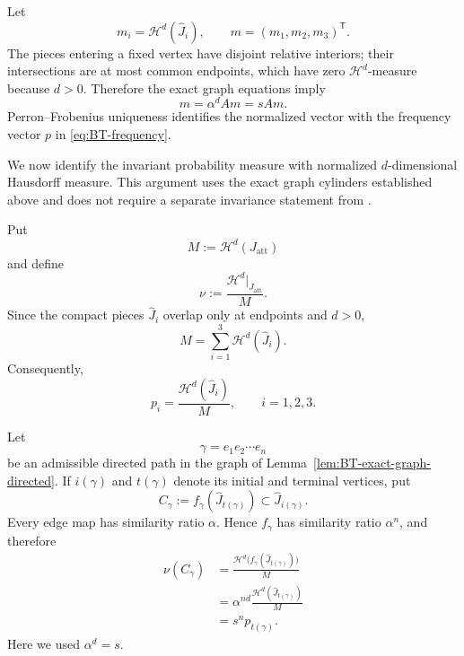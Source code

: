 \documentclass[11pt]{amsart}
\theoremstyle{plain}
\theoremstyle{definition}
\theoremstyle{remark}
\begin{document}
Let
\[
        m_i=\mathcal H^d(\widehat J_i),
        \qquad
        m=(m_1,m_2,m_3)^{\mathsf T}.
\]
The pieces entering a fixed vertex have disjoint relative interiors; their intersections are
at most common endpoints, which have zero \(\mathcal H^d\)-measure because \(d>0\).
Therefore the exact graph equations imply
\[
        m=\alpha^dAm=sAm.
\]
Perron--Frobenius uniqueness identifies the normalized vector with the frequency vector
\(p\) in \eqref{eq:BT-frequency}.

We now identify the invariant probability measure with normalized
\(d\)-dimensional Hausdorff measure. This argument uses the exact graph
cylinders established above and does not require a separate invariance
statement from \cite{BruinTroubetzkoy2003}.

Put
\[
        M:=\mathcal H^d(J_{\mathrm{att}})
\]
and define
\[
        \nu
        :=
        \frac{\mathcal H^d|_{J_{\mathrm{att}}}}{M}.
\]
Since the compact pieces \(\widehat J_i\) overlap only at endpoints and
\(d>0\),
\[
        M
        =
        \sum_{i=1}^{3}\mathcal H^d(\widehat J_i).
\]
Consequently,
\[
        p_i
        =
        \frac{\mathcal H^d(\widehat J_i)}{M},
        \qquad i=1,2,3.
\tag{B.3}
\label{eq:BT-Hausdorff-vertex-masses}
\]

Let
\[
        \gamma=e_1e_2\cdots e_n
\]
be an admissible directed path in the graph of
Lemma~\ref{lem:BT-exact-graph-directed}. If \(i(\gamma)\) and
\(t(\gamma)\) denote its initial and terminal vertices, put
\[
        C_\gamma
        :=
        f_\gamma(\widehat J_{t(\gamma)})
        \subset\widehat J_{i(\gamma)}.
\]
Every edge map has similarity ratio \(\alpha\). Hence
\(f_\gamma\) has similarity ratio \(\alpha^n\), and therefore
\[
\begin{aligned}
        \nu(C_\gamma)
        &=
        \frac{
        \mathcal H^d
        \bigl(f_\gamma(\widehat J_{t(\gamma)})\bigr)
        }{M}\\
        &=
        \alpha^{nd}
        \frac{\mathcal H^d(\widehat J_{t(\gamma)})}{M}\\
        &=
        s^n p_{t(\gamma)}.
\end{aligned}
\tag{B.4}
\label{eq:BT-Hausdorff-cylinder-mass}
\]
Here we used \(\alpha^d=s\).
\end{document}
